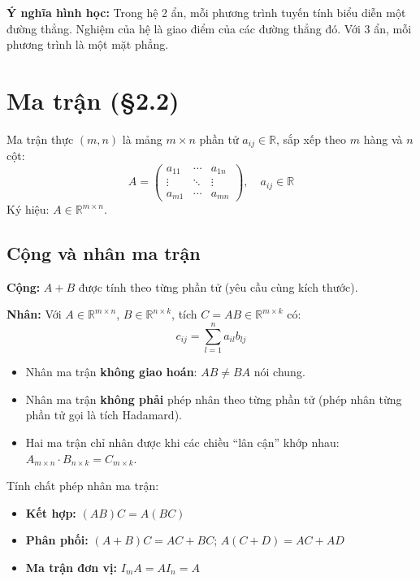 \documentclass[12pt,a4paper]{article}
\begin{document}
\textbf{Ý nghĩa hình học:} Trong hệ 2 ẩn, mỗi phương trình tuyến tính biểu diễn một đường thẳng. Nghiệm của hệ là giao điểm của các đường thẳng đó. Với 3 ẩn, mỗi phương trình là một mặt phẳng.

\section{Ma trận (§2.2)}

\begin{dinhnghia}
Ma trận thực $(m, n)$ là mảng $m \times n$ phần tử $a_{ij} \in \mathbb{R}$, sắp xếp theo $m$ hàng và $n$ cột:
\[
  A = \begin{pmatrix} a_{11} & \cdots & a_{1n} \\ \vdots & \ddots & \vdots \\ a_{m1} & \cdots & a_{mn} \end{pmatrix}, \quad a_{ij} \in \mathbb{R}
\]
Ký hiệu: $A \in \mathbb{R}^{m \times n}$.
\end{dinhnghia}

\subsection{Cộng và nhân ma trận}

\textbf{Cộng:} $A + B$ được tính theo từng phần tử (yêu cầu cùng kích thước).

\textbf{Nhân:} Với $A \in \mathbb{R}^{m \times n}$, $B \in \mathbb{R}^{n \times k}$, tích $C = AB \in \mathbb{R}^{m \times k}$ có:
\[
  c_{ij} = \sum_{l=1}^{n} a_{il} b_{lj}
\]

\begin{luuy}
\begin{itemize}
  \item Nhân ma trận \textbf{không giao hoán}: $AB \ne BA$ nói chung.
  \item Nhân ma trận \textbf{không phải} phép nhân theo từng phần tử (phép nhân từng phần tử gọi là tích Hadamard).
  \item Hai ma trận chỉ nhân được khi các chiều ``lân cận'' khớp nhau: $A_{m \times n} \cdot B_{n \times k} = C_{m \times k}$.
\end{itemize}
\end{luuy}

\begin{dinhly}
Tính chất phép nhân ma trận:
\begin{itemize}
  \item \textbf{Kết hợp:} $(AB)C = A(BC)$
  \item \textbf{Phân phối:} $(A+B)C = AC + BC$; $A(C+D) = AC + AD$
  \item \textbf{Ma trận đơn vị:} $I_m A = A I_n = A$
\end{itemize}
\end{dinhly}
\end{document}
